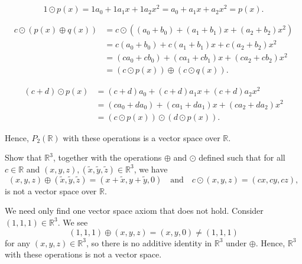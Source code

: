 \begin{solution}
\begin{enumerate}
    \begin{equation*}
        1\odot p(x)=1a_0+1a_1x+1a_2x^2=a_0+a_1x+a_2x^2=p(x).
    \end{equation*}

    \begin{align*}
        c\odot(p(x)\oplus q(x)) &= c\odot((a_0+b_0)+(a_1+b_1)x+(a_2+b_2)x^2) \\
        &= c(a_0+b_0)+c(a_1+b_1)x+c(a_2+b_2)x^2 \\
        &= (ca_0+cb_0)+(ca_1+cb_1)x+(ca_2+cb_2)x^2 \\
        &= (c\odot p(x))\oplus(c\odot q(x)).
    \end{align*}

    \begin{align*}
        (c+d)\odot p(x) &= (c+d)a_0+(c+d)a_1x+(c+d)a_2x^2 \\
        &= (ca_0+da_0)+(ca_1+da_1)x+(ca_2+da_2)x^2 \\
        &= (c\odot p(x))\odot(d\odot p(x)).
    \end{align*}
\end{enumerate}
Hence, $ P_2(\mathbb{R}) $ with these operations is a vector space over $ \mathbb{R} $.
\end{solution}

\begin{example}
Show that $ \mathbb{R}^3 $, together with the operations $ \oplus $ and $ \odot $ defined such that for all $ c\in\mathbb{R} $ and $ (x,y,z),(\tilde{x},\tilde{y},\tilde{z})\in\mathbb{R}^3 $, we have
\begin{equation*}
    (x,y,z)\oplus(\tilde{x},\tilde{y},\tilde{z})=(x+\tilde{x},y+\tilde{y},0) \quad\text{and}\quad c\odot(x,y,z)=(cx,cy,cz),
\end{equation*}
is not a vector space over $ \mathbb{R} $.
\end{example}
\begin{solution}
We need only find one vector space axiom that does not hold. Consider $ (1,1,1)\in\mathbb{R}^3 $. We see
\begin{equation*}
    (1,1,1)\oplus(x,y,z)=(x,y,0)\neq (1,1,1)
\end{equation*}
for any $ (x,y,z)\in\mathbb{R}^3 $, so there is no additive identity in $ \mathbb{R}^3 $ under $ \oplus $. Hence, $ \mathbb{R}^3 $ with these operations is not a vector space.
\end{solution}

